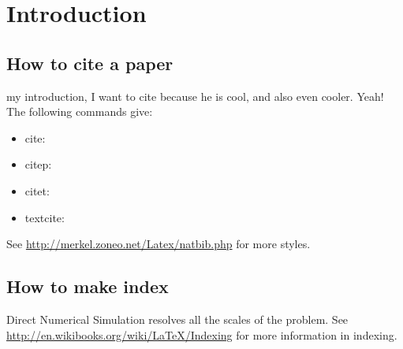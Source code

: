 \chapter{Introduction}
\label{sec: Introduction}

\section{How to cite a paper}
\label{sec: How to cite a paper}

my introduction, I want to cite \citep{Moeng2007} because he is cool, and also \textcite{Pope2000} even cooler. Yeah! The following commands  give:
\begin{itemize}
\item cite: \cite{Moeng2007}
\item citep: \citep{Moeng2007}	
\item citet: \citet{Moeng2007}	
\item textcite: \textcite{Moeng2007}	
\end{itemize}
See \url{http://merkel.zoneo.net/Latex/natbib.php} for more styles.

\section{How to make index}
\label{sec:How to make index}
Direct Numerical Simulation  resolves all the scales of the problem. See \url{http://en.wikibooks.org/wiki/LaTeX/Indexing} for more information in indexing.

